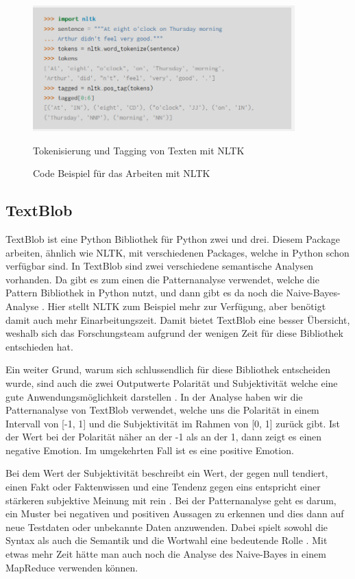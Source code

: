 	\begin{figure}[ht]
		\centering
		\includegraphics[width=0.9\textwidth]{images/Kapitel2/Code_Beispiel_2}
			\caption{\label{fig:CodeBeispiel}Code Beispiel für das Arbeiten mit NLTK}{Tokenisierung und Tagging von Texten mit NLTK}
	\end{figure}
	
	\subsection{TextBlob}
	
TextBlob ist eine Python Bibliothek für Python zwei und drei. Diesem Package arbeiten, ähnlich wie NLTK, mit verschiedenen Packages, welche in Python schon verfügbar sind. In TextBlob sind zwei verschiedene semantische Analysen vorhanden. Da gibt es zum einen die Patternanalyse verwendet, welche die Pattern Bibliothek in Python nutzt, und dann gibt es da noch die Naive-Bayes-Analyse . Hier stellt NLTK zum Beispiel mehr zur Verfügung, aber benötigt damit auch mehr Einarbeitungszeit. Damit bietet TextBlob eine besser Übersicht, weshalb sich das Forschungsteam aufgrund der wenigen Zeit für diese Bibliothek entschieden hat.
	
Ein weiter Grund, warum sich schlussendlich für diese Bibliothek entscheiden wurde, sind auch die zwei Outputwerte Polarität und Subjektivität welche eine gute Anwendungsmöglichkeit darstellen . In der Analyse haben wir die Patternanalyse von TextBlob verwendet, welche uns die Polarität in einem Intervall von [-1, 1] und die Subjektivität im Rahmen von [0, 1] zurück gibt. Ist der Wert bei der Polarität näher an der -1 als an der 1, dann zeigt es einen negative Emotion. Im umgekehrten Fall ist es eine positive Emotion.
	
Bei dem Wert der Subjektivität beschreibt ein Wert, der gegen null tendiert, einen Fakt oder Faktenwissen und eine Tendenz gegen eins entspricht einer stärkeren subjektive Meinung mit rein  . Bei der Patternanalyse geht es darum, ein Muster bei negativen und positiven Aussagen zu erkennen und dies dann auf neue Testdaten oder unbekannte Daten anzuwenden. Dabei spielt sowohl die Syntax als auch die Semantik und die Wortwahl eine bedeutende Rolle . Mit etwas mehr Zeit hätte man auch noch die Analyse des Naive-Bayes in einem MapReduce verwenden können.

